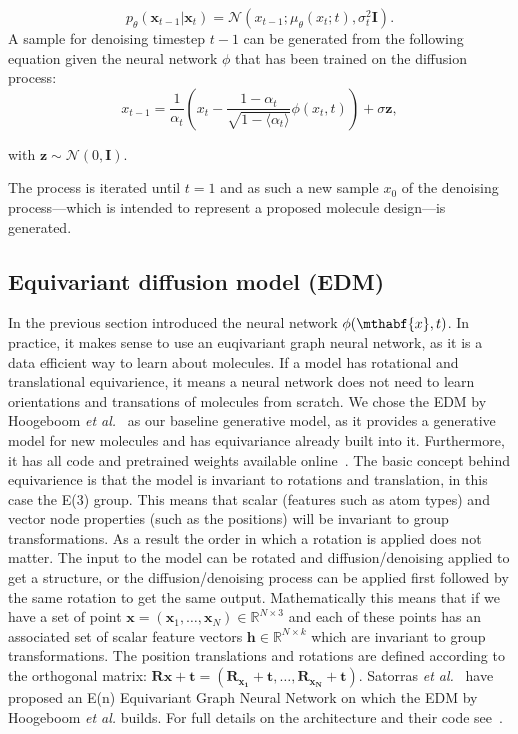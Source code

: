 \documentclass[journal=jacsat,manuscript=article]{achemso}
\begin{document}
\begin{equation}
p_{\theta}(\mathbf{x}_{t-1}|\mathbf{x}_t)=\mathcal{N}(x_{t-1}; \mu_{\theta}(x_t;t), \sigma_t^2\mathbf{I}).
\end{equation}
A sample for denoising timestep $t-1$ can be generated from the following equation given the neural network $\phi$ that has been trained on the diffusion process: 
\begin{equation}
 x_{t-1} = \frac{1}{\alpha_t}(x_t-\frac{1-\alpha_t}{\sqrt{1-\langle\alpha_t\rangle}}\phi(x_t,t)) +\sigma \mathbf{z},   
\end{equation}

with $\mathbf{z}\sim\mathcal{N}(0,\mathbf{I})$.

The process is iterated until $t=1$ and as such a new sample $x_0$ of the denoising process---which is intended to represent a proposed molecule design---is generated. 

\subsection*{Equivariant diffusion model (EDM)}
In the previous section introduced the neural network $\phi(\mthabf{x},t)$. In practice, it makes sense to use an euqivariant graph neural network, as it is a data efficient way to learn about molecules. If a model has rotational and translational equivarience, it means a neural network does not need to learn orientations and transations of molecules from scratch. We chose the EDM by Hoogeboom \textit{et al.}~\cite{hoogeboom2022equivariant} as our baseline generative model, as it provides a generative model for new molecules and has equivariance already built into it. Furthermore, it has all code and pretrained weights available online~\cite{githubhoogeboom}. The basic concept behind equivarience is that the model is invariant to rotations and translation, in this case the E(3) group. This means that scalar (features such as atom types) and vector node properties (such as the positions) will be invariant to group transformations. As a result the order in which a rotation is applied does not matter. The input to the model can be rotated and diffusion/denoising  applied to get a structure, or the diffusion/denoising process can be applied first followed by the same rotation to get the same output. 
Mathematically this means that if we have a set of point $\mathbf{x} = (\mathbf{x}_1,\ldots,\mathbf{x}_N) \in \mathbb{R}^{N\times 3}$ and each of these points has an associated set of scalar feature vectors $\mathbf{h}\in \mathbb{R}^{N\times k}$ which are invariant to group transformations. The position translations and rotations are defined according to the orthogonal matrix: $\mathbf{Rx + t} = (\mathbf{R_{x_1}+t},\ldots, \mathbf{R_{x_N}+t})$. Satorras \textit{et al.}~\cite{satorras2022equivariant} have proposed an E(n) Equivariant Graph Neural Network on which the EDM by Hoogeboom \textit{et al.} builds. For full details on the architecture and their code see~\cite{hoogeboom2022equivariant}. 
\end{document}
